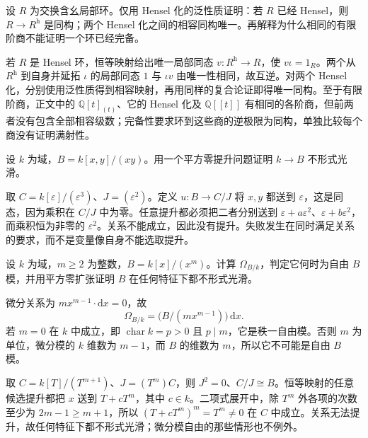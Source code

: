 \begin{optionalexercise}\label{b3:ex:23-henselization-universal}
	设 \(R\) 为交换含幺局部环。仅用 Hensel 化的泛性质证明：若 \(R\) 已经 Hensel，则 \(R\to R^{\mathrm h}\) 是同构；两个 Hensel 化之间的相容同构唯一。再解释为什么相同的有限阶商不能证明一个环已经完备。
\end{optionalexercise}
\begin{solution}
	若 \(R\) 是 Hensel 环，恒等映射给出唯一局部同态 \(v:R^{\mathrm h}\to R\)，使 \(v\iota=1_R\)。两个从 \(R^{\mathrm h}\) 到自身并延拓 \(\iota\) 的局部同态 \(1\) 与 \(\iota v\) 由唯一性相同，故互逆。对两个 Hensel 化，分别使用泛性质得到相容映射，再用同样的复合论证即得唯一同构。至于有限阶商，正文中的 \(\mathbb Q[t]_{(t)}\)、它的 Hensel 化及 \(\mathbb Q[\![t]\!]\) 有相同的各阶商，但前两者没有包含全部相容级数；完备性要求环到这些商的逆极限为同构，单独比较每个商没有证明满射性。
\end{solution}

\begin{optionalexercise}\label{b3:ex:23-node-lifting-obstruction}
	设 \(k\) 为域，\(B=k[x,y]/(xy)\)。用一个平方零提升问题证明 \(k\to B\) 不形式光滑。
\end{optionalexercise}
\begin{solution}
	取 \(C=k[\varepsilon]/(\varepsilon^3)\)、\(J=(\varepsilon^2)\)。定义 \(u:B\to C/J\) 将 \(x,y\) 都送到 \(\varepsilon\)，这是同态，因为乘积在 \(C/J\) 中为零。任意提升都必须把二者分别送到 \(\varepsilon+a\varepsilon^2\)、\(\varepsilon+b\varepsilon^2\)，而乘积恒为非零的 \(\varepsilon^2\)。关系不能成立，因此没有提升。失败发生在同时满足关系的要求，而不是变量像自身不能选取提升。
\end{solution}

\begin{optionalexercise}\label{b3:ex:23-free-differentials-not-smooth}
	设 \(k\) 为域，\(m\ge2\) 为整数，\(B=k[x]/(x^m)\)。计算 \(\Omega_{B/k}\)，判定它何时为自由 \(B\) 模，并用平方零扩张证明 \(B\) 在任何特征下都不形式光滑。
\end{optionalexercise}
\begin{solution}
	微分关系为 \(m x^{m-1}\cdot\mathrm{d}x=0\)，故
	\[
		\Omega_{B/k}=\bigl(B/(m x^{m-1})\bigr)\,\mathrm{d}x.
	\]
	若 \(m=0\) 在 \(k\) 中成立，即 \(\operatorname{char}k=p>0\) 且 \(p\mid m\)，它是秩一自由模。否则 \(m\) 为单位，微分模的 \(k\) 维数为 \(m-1\)，而 \(B\) 的维数为 \(m\)，所以它不可能是自由 \(B\) 模。

	取 \(C=k[T]/(T^{m+1})\)、\(J=(T^m)C\)，则 \(J^2=0\)、\(C/J\cong B\)。恒等映射的任意候选提升都把 \(x\) 送到 \(T+cT^m\)，其中 \(c\in k\)。二项式展开中，除 \(T^m\) 外各项的次数至少为 \(2m-1\ge m+1\)，所以 \((T+cT^m)^m=T^m\ne0\) 在 \(C\) 中成立。关系无法提升，故任何特征下都不形式光滑；微分模自由的那些情形也不例外。
\end{solution}

